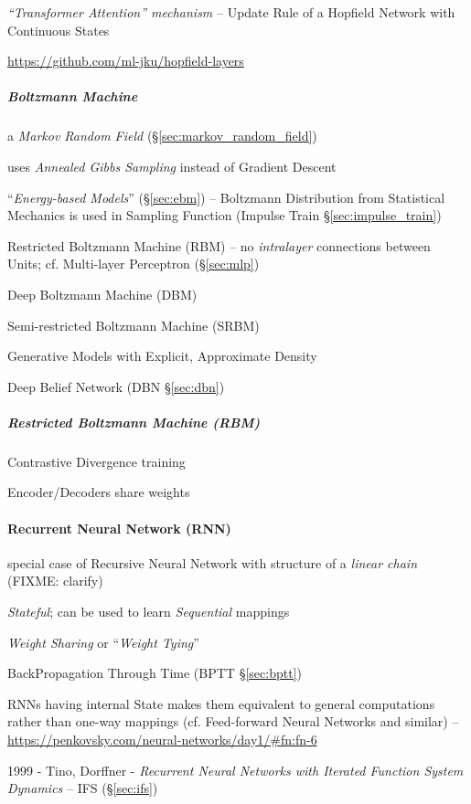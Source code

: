\emph{``Transformer Attention'' mechanism} -- Update Rule of a Hopfield Network
with Continuous States

\url{https://github.com/ml-jku/hopfield-layers}



\subparagraph{Boltzmann Machine}\label{sec:boltzmann_machine}\hfill

a \emph{Markov Random Field} (\S\ref{sec:markov_random_field})

uses \emph{Annealed Gibbs Sampling} instead of Gradient Descent

``\emph{Energy-based Models}'' (\S\ref{sec:ebm}) -- Boltzmann Distribution from
Statistical Mechanics is used in Sampling Function (Impulse Train
\S\ref{sec:impulse_train})

Restricted Boltzmann Machine (RBM) -- no \emph{intralayer} connections between
Units; cf. Multi-layer Perceptron (\S\ref{sec:mlp})

Deep Boltzmann Machine (DBM)

Semi-restricted Boltzmann Machine (SRBM)

Generative Models with Explicit, Approximate Density

Deep Belief Network (DBN \S\ref{sec:dbn})



\subparagraph{Restricted Boltzmann Machine (RBM)}\label{sec:rbm}\hfill

Contrastive Divergence training

Encoder/Decoders share weights



\paragraph{Recurrent Neural Network (RNN)}\label{sec:rnn}\hfill

special case of Recursive Neural Network with structure of a \emph{linear chain}
(FIXME: clarify)

\emph{Stateful}; can be used to learn \emph{Sequential} mappings

\emph{Weight Sharing} or ``\emph{Weight Tying}''

BackPropagation Through Time (BPTT \S\ref{sec:bptt})

RNNs having internal State makes them equivalent to general computations rather
than one-way mappings (cf. Feed-forward Neural Networks and similar)
--\url{https://penkovsky.com/neural-networks/day1/#fn:fn-6}

1999 - Tino, Dorffner - \emph{Recurrent Neural Networks with Iterated Function
  System Dynamics} -- IFS (\S\ref{sec:ifs})

